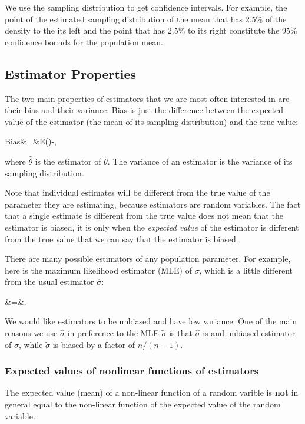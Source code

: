 We use the sampling distribution to get confidence intervals. For example, the point of the estimated sampling distribution of the mean that has 2.5\% of the density to the its left and the point that has 2.5\% to its right constitute the 95\% confidence bounds for the population mean.


\subsection{Estimator Properties}

The two main properties of estimators that we are most often interested in are their bias and their variance. Bias is just the difference between the expected value of the estimator (the mean of its sampling distribution) and the true value:

\be
\mbox{Bias}&=&E(\hat{\theta})-\theta,
\ee

\noindent
where $\hat{\theta}$ is the estimator of $\theta$. The variance of an estimator is the variance of its sampling distribution.

Note that individual estimates will be different from the true value of the parameter they are estimating, because estimators are random variables. The fact that a single estimate is  different from the true value does not mean that the estimator is biased, it is only when the \textit{expected value} of the estimator is different from the true value that we can say that the estimator is biased.

There are many possible estimators of any population parameter. For example, here is the maximum likelihood estimator (MLE) of $\sigma$, which is a little different from the usual estimator $\hat{\sigma}$:

\be
\tilde{\sigma}&=&.
\ee

We would like estimators to be unbiased and have low variance. One of the main reasons we use $\hat{\sigma}$ in preference to the MLE $\tilde{\sigma}$ is that $\hat{\sigma}$ is and unbiased estimator of $\sigma$, while $\tilde{\sigma}$ is biased by a factor of $n/(n-1)$.

\subsubsection{Expected values of nonlinear functions of estimators}

The expected value (mean) of a non-linear function of a random varible is \textbf{not} in general equal to the non-linear function of the expected value of the random variable. 

